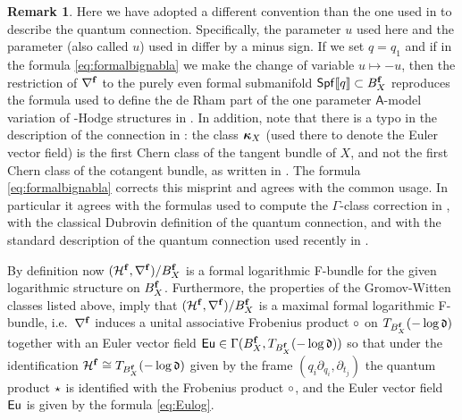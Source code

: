 \documentclass[twoside,leqno]{article}
\numberwithin{equation}{section}
\theoremstyle{plain}
\theoremstyle{definition}
\newtheorem{remark}[equation]{Remark}
\begin{document}
\begin{remark} \label{rem:compare.with.KKP}
 Here we have adopted a different convention than the one used
 in \cite{Katzarkov_Hodge_theoretic_aspects} to describe the quantum
 connection. Specifically, the parameter $u$ used here and the
 parameter (also called $u$) used
 in \cite[Section~3.1]{Katzarkov_Hodge_theoretic_aspects} differ by a
 minus sign. If we set $q = q_{1}$ and if in the
 formula \eqref{eq:formalbignabla} we make the change of variable
 $u \mapsto -u$, then the restriction of $\nabla^{\mathbf{f}}$ to the purely even
 formal submanifold $\mathsf{Spf}[\![q]\!] \subset B_{X}^{\mathbf{f}}$ reproduces
 the formula used to define the de Rham part of the one parameter
 $\mathsf{A}$-model variation of \nc-Hodge structures
 in \cite[Section~3.1]{Katzarkov_Hodge_theoretic_aspects}. In
 addition, note that there is a typo in the description of the
 connection in \cite[Section~3.1]{Katzarkov_Hodge_theoretic_aspects}:
 the class $\boldsymbol{\kappa}_{X}$ (used there to denote the Euler vector field) is the first Chern class of the tangent bundle of $X$, and not the first Chern class of the cotangent bundle, as  written in \cite[Section~3.1]{Katzarkov_Hodge_theoretic_aspects}. The
 formula \eqref{eq:formalbignabla} corrects this misprint  and agrees with the common usage. In particular  it agrees with
 the formulas used to compute the $\Gamma$-class correction in \cite[Section~3.1]{Katzarkov_Hodge_theoretic_aspects}, with the  classical Dubrovin definition \cite{Dubrovin_Geometry_of_2D} of the quantum connection, and with the standard 
 description of the quantum connection used recently in \cite{Iritani_blowup,PS-ET,Chen-ET,HYZZ_Decomposition}.
\end{remark}

\medskip


By definition now  
$(\mathcal H^{\mathbf{f}},\nabla^{\mathbf{f}})/B_{X}^{\mathbf{f}}$ is a formal logarithmic F-bundle for the given logarithmic structure on $B_{X}^{\mathbf{f}}$. Furthermore, the properties of the Gromov-Witten classes listed above, imply that $(\mathcal H^{\mathbf{f}},\nabla^{\mathbf{f}})/B_{X}^{\mathbf{f}}$ is a 
maximal formal logarithmic F-bundle, i.e.\ $\nabla^{\mathbf{f}}$ induces a unital associative Frobenius product $\circ$ on $T_{B_{X}^{\mathbf{f}}}(-\log \mathfrak{d})$
together with an Euler vector field $\operatorname{\mathsf{Eu}} \in \Gamma(B_{X}^{\mathbf{f}}, T_{B_{X}^{\mathbf{f}}}(-\log \mathfrak{d}))$ so that under the 
identification $\mathcal H^{\mathbf{f}} \cong 
T_{B_{X}^{\mathbf{f}}}(-\log \mathfrak{d})$ given by the frame $(q_{i}\partial_{q_{i}}, \partial_{t_{j}})$ the quantum product $\star$ is identified with the Frobenius product $\circ$, and the Euler vector field $\operatorname{\mathsf{Eu}}$ is given by the formula \eqref{eq:Eulog}.
\end{document}
